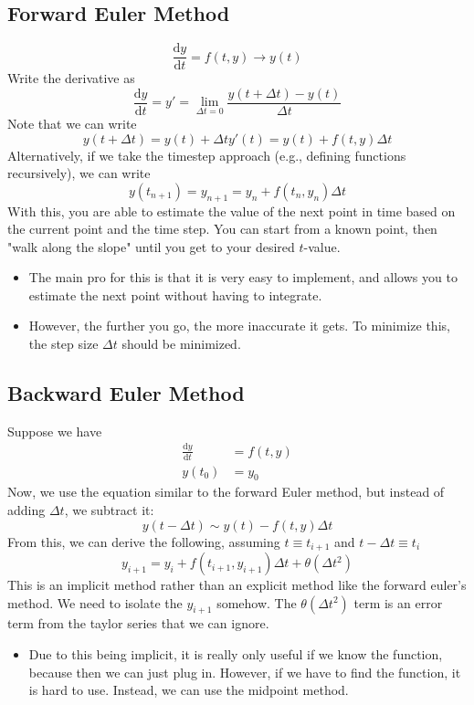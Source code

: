 \documentclass[10pt]{article}
\newcommand{\dd}{\text{d}}
\begin{document}
\subsection*{Forward Euler Method}
\[\frac{\dd y}{\dd t} = f(t, y) \rightarrow y(t)\]
Write the derivative as
\[\frac{\dd y}{\dd t} = y' = \lim_{\Delta t = 0}\frac{y(t + \Delta t) - y(t)}{\Delta t}\]
Note that we can write
\[y(t + \Delta t) = y(t) + \Delta t y'(t) = y(t) + f(t, y) \Delta t\]
Alternatively, if we take the timestep approach (e.g., defining functions recursively), we can write
\[y(t_{n + 1}) = y_{n + 1} = y_n + f(t_n, y_n) \Delta t\]
With this, you are able to estimate the value of the next point in time based on the current point and the time step.  You can start from a known point, then "walk along the slope" until you get to your desired $t$-value.
\begin{itemize}
	\item The main pro for this is that it is very easy to implement, and allows you to estimate the next point without having to integrate.
	\item However, the further you go, the more inaccurate it gets.  To minimize this, the step size $\Delta t$ should be minimized.
\end{itemize}

\subsection*{Backward Euler Method}
Suppose we have
\begin{align*}
    \frac{\dd y}{\dd t} &= f(t, y)\\
    y(t_0) &= y_0
\end{align*}
Now, we use the equation similar to the forward Euler method, but instead of adding $\Delta t$, we subtract it:
\[y(t - \Delta t) \sim y(t) - f(t, y) \Delta t\]
From this, we can derive the following, assuming $t \equiv t_{i + 1}$ and $t - \Delta t \equiv t_i$
\[y_{i + 1} = y_i + f(t_{i + 1}, y_{i + 1}) \Delta t + \theta(\Delta t^2)\]
This is an implicit method rather than an explicit method like the forward euler's method.  We need to isolate the $y_{i + 1}$ somehow.  The $\theta(\Delta t^2)$ term is an error term from the taylor series that we can ignore.
\begin{itemize}
	\item Due to this being implicit, it is really only useful if we know the function, because then we can just plug in.  However, if we have to find the function, it is hard to use.  Instead, we can use the midpoint method.
\end{itemize}
\end{document}
